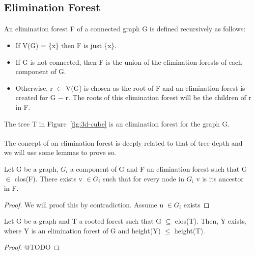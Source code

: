 \subsection{Elimination Forest}
\paragraph{}
An elimination forest F of a connected graph G is defined recursively as follows:
\begin{itemize}
  \item If V(G) = \{x\} then F is just \{x\}.
  \item If G is not connected, then F is the union of the elimination forests of each component of G.
  \item Otherwise, r $\in$ V(G) is chosen as the root of F and an elimination forest is created for G $-$ r. The roots of this elimination forest will be the children of r in F.
\end{itemize}
The tree T in Figure~\ref{fig:3d-cube} is an elimination forest for the graph G.

\paragraph{}
The concept of an elimination forest is deeply related to that of tree depth and we will use some lemmas to prove so.

\begin{lemma}
Let G be a graph, $G_i$ a component of G and F an elimination forest such that G $\in$ clos(F). There exists v $\in G_i$ such that for every node in $G_i$ v is its ancestor in F.
\end{lemma}
\begin{proof}
We will proof this by contradiction. Assume u $\in G_i$ exists
\end{proof}

\begin{lemma}
\label{lema:min-ET}
Let G be a graph and T a rooted forest such that G $\subseteq$ clos(T). Then, Y exists, where Y is an elimination forest of G and height(Y) $\leq$ height(T).
\end{lemma}

\begin{proof}
@TODO
\end{proof}

\paragraph{} 
